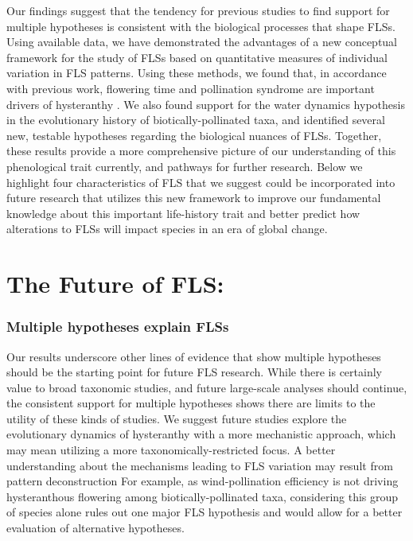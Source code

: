 \documentclass{article}
\begin{document}

\noindent Our findings suggest that the tendency for previous studies to find support for multiple hypotheses \citep{Bolmgren2003,Gougherty2018,Savage2019} is consistent with the biological processes that shape FLSs. Using available data, we have demonstrated the advantages of a new conceptual framework for the study of FLSs based on quantitative measures of individual variation in FLS patterns. Using these methods, we found that, in accordance with previous work, flowering time and pollination syndrome are important drivers of hysteranthy \citep{Gougherty2018}. We also found support for the water dynamics hypothesis in the evolutionary history of biotically-pollinated taxa, and identified several new, testable hypotheses regarding the biological nuances of FLSs. Together, these results provide a more comprehensive picture of our understanding of this phenological trait currently, and pathways for further research. Below we highlight four characteristics of FLS that we suggest could be incorporated into future research that utilizes this new framework to improve our fundamental knowledge about this important life-history trait and better predict how alterations to FLSs will impact species in an era of global change.\\
\section*{The Future of FLS:}
\subsubsection*{Multiple hypotheses explain FLSs}
\noindent Our results underscore other lines of evidence that show multiple hypotheses should be the starting point for future FLS research. While there is certainly value to broad taxonomic studies, and future large-scale analyses should continue, the consistent support for multiple hypotheses shows there are limits to the utility of these kinds of studies. We suggest future studies explore the evolutionary dynamics of hysteranthy with a more mechanistic approach, which may mean utilizing a more taxonomically-restricted focus. A better understanding about the mechanisms leading to FLS variation may result from pattern deconstruction \citep[i.e. grouping of species according to trait commonalities or their geographic or phylogenetic distributions,][]{Terribile2009} For example, as wind-pollination efficiency is not driving hysteranthous flowering among biotically-pollinated taxa, considering this group of species alone rules out one major FLS hypothesis and would allow for a better evaluation of alternative hypotheses.\\ 
\end{document}
